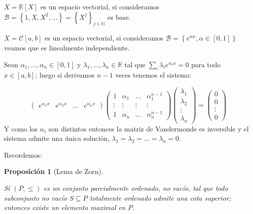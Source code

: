 \documentclass[11pt]{article}
\newcommand{\B}{\mathcal{B}}
\newcommand{\R}{{\mathbb{R}}}
\newcommand{\N}{{\mathbb{N}}}
\newcommand{\sett}[1]{\left\lbrace#1\right\rbrace}
\newcommand{\Bigsum}[2]{\sum\limits_{#1}{#2}}
\numberwithin{theorem}{subsection}
\newtheorem{proposition}[theorem]{Proposici\'on}
\newenvironment{proof}[1][Demostraci\'on]{\begin{trivlist}
		\item[\hskip \labelsep {\bfseries #1}]}{\end{trivlist}}
\newenvironment{example}[1][Ejemplo]{\begin{trivlist}
		\item[\hskip \labelsep {\bfseries #1 }]}{\end{trivlist}}
\newcommand{\qed}{\nobreak \ifvmode \relax \else
	\ifdim\lastskip<1.5em \hskip-\lastskip
	\hskip1.5em plus0em minus0.5em \fi \nobreak
	\vrule height0.75em width0.5em depth0.25em\fi}
\begin{document}
\begin{example}



\begin{itemize}
	\item $X=\R[X]$ es un espacio vectorial, si consideramos $\B = \sett{1,X,X^2, \dots} = \sett{X^j}_{j \in \N}$ es base.
	\item $X=\mathcal{C}[a,b]$ es un espacio vectorial, si consideramos $\B = \sett{e^{\alpha x}, \alpha \in [0,1]}$ veamos que es linealmente independiente.
	
	\begin{proof}
		Sean $\alpha_1, \dots, \alpha_n \in [0,1]$ y $\lambda_{1}, \dots, \lambda_{n} \in \R$ tal que $\Bigsum{i}{\lambda_i e^{\alpha_i x}} = 0$ para todo $x \in [a,b]$; luego si derivamos $n-1$ veces tenemos el sistema:
		
		\[
			\left(
				\begin{array}{cccc}
					e^{\alpha_1 x} &  e^{\alpha_2 x} &  \dots &  e^{\alpha_n x} 
				\end{array}
			\right)
			\left(
				\begin{array}{cccc}
					1 & \alpha_1 &  \dots &  \alpha_1^{n-1} \\
					\vdots & \vdots & \vdots & \vdots \\
					1 &  \alpha_n &  \dots &  \alpha_n^{n-1}					 
				\end{array}
			\right)
			\left(
			\begin{array}{c}
			\lambda_{1} \\
			\lambda_{2} \\
			\vdots \\
			\lambda_{n}
			\end{array}
			\right) = 
			\left(
			\begin{array}{c}
			0 \\
			0 \\
			\vdots \\
			0
			\end{array}
			\right)
		\]
		Y como los $\alpha_i$ son distintos entonces la matriz de Vandermonde es inversible y el sistema admite una \'unica soluci\'on, $\lambda_{1} = \lambda_{2} = \dots = \lambda_{n} = 0$. \qed
	\end{proof}

\end{itemize}
\end{example}

Recordemos:

\begin{proposition}[Lema de Zorn]
	\label{Lema de Zorn}
	
	Si $(P,\leq)$ es un conjunto parcialmente ordenado, no vac\'io, tal que todo subconjunto no vac\'io $S \subseteq P$ totalmente ordenado admite una cota superior; entonces existe un elemento maximal en $P$.
\end{proposition}
\end{document}
